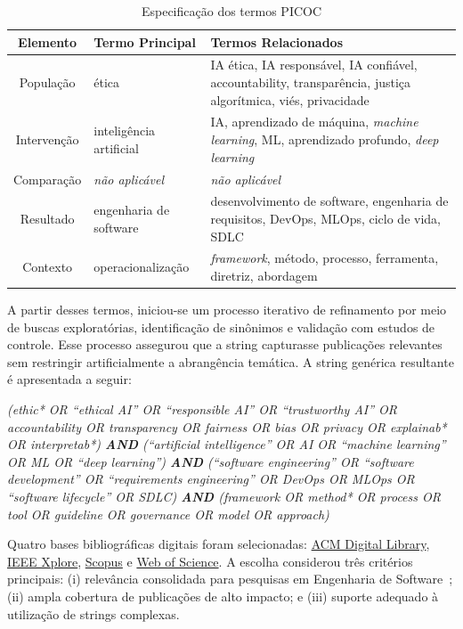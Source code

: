 \begin{table}[htbp]
  \centering
  \caption{Especificação dos termos \acrshort{PICOC}}
  \label{tab:picoc}
  \begin{tabular}{cp{3.5cm}p{8.5cm}}
    \hline
    \textbf{Elemento} & \textbf{Termo Principal} & \textbf{Termos Relacionados} \\
    \hline
    População & ética & IA ética, IA responsável, IA confiável, accountability, transparência, justiça algorítmica, viés, privacidade \\
    Intervenção & inteligência artificial & IA, aprendizado de máquina, \textit{machine learning}, ML, aprendizado profundo, \textit{deep learning} \\
    Comparação & \textit{não aplicável} & \textit{não aplicável} \\
    Resultado & engenharia de software & desenvolvimento de software, engenharia de requisitos, DevOps, MLOps, ciclo de vida, SDLC \\
    Contexto & operacionalização & \textit{framework}, método, processo, ferramenta, diretriz, abordagem \\
    \hline
  \end{tabular}
\end{table}

A partir desses termos, iniciou-se um processo iterativo de refinamento por meio de buscas exploratórias, identificação de sinônimos e validação com estudos de controle. Esse processo assegurou que a string capturasse publicações relevantes sem restringir artificialmente a abrangência temática. A string genérica resultante é apresentada a seguir:

\vspace{0.3cm}
\colorbox{formalshade}{\parbox{0.9\columnwidth}{\small\emph{(ethic* OR ``ethical AI'' OR ``responsible AI'' OR ``trustworthy AI'' OR accountability OR transparency OR fairness OR bias OR privacy OR explainab* OR interpretab*) \textbf{AND} (``artificial intelligence'' OR AI OR ``machine learning'' OR ML OR ``deep learning'') \textbf{AND} (``software engineering'' OR ``software development'' OR ``requirements engineering'' OR DevOps OR MLOps OR ``software lifecycle'' OR SDLC) \textbf{AND} (framework OR method* OR process OR tool OR guideline OR governance OR model OR approach)}}}
\vspace{0.3cm}

Quatro bases bibliográficas digitais foram selecionadas: \href{https://dl.acm.org/}{ACM Digital Library}, \href{https://ieeexplore.ieee.org/}{IEEE Xplore}, \href{https://www.scopus.com/}{Scopus} e \href{https://www.webofscience.com/}{Web of Science}. A escolha considerou três critérios principais: (i) relevância consolidada para pesquisas em Engenharia de Software~\cite{Brereton2007}; (ii) ampla cobertura de publicações de alto impacto; e (iii) suporte adequado à utilização de strings complexas. 


